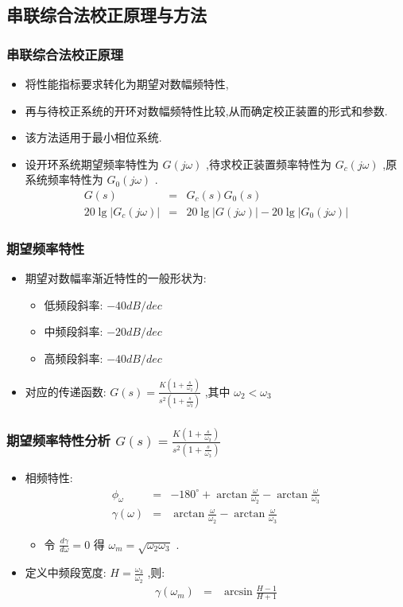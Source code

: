 \documentclass[table]{beamer}
\begin{document}
\subsection{串联综合法校正原理与方法}
\label{sec-5-1}
\begin{frame}
\frametitle{串联综合法校正原理}
\label{sec-5-1-1}

\begin{itemize}
\item <2->将性能指标要求转化为期望对数幅频特性,
\item <3->再与待校正系统的开环对数幅频特性比较,从而确定校正装置的形式和参数.
\item <4->该方法适用于最小相位系统.
\item <5->设开环系统期望频率特性为 $G(j\omega)$ ,待求校正装置频率特性为 $G_c(j\omega)$ ,原系统频率特性为 $G_0(j\omega)$ .
      \begin{eqnarray*}
      G(s) &= &G_c(s)G_0(s) \\
      20\lg|G_c(j\omega)| &=& 20\lg|G(j\omega)|-20\lg|G_0(j\omega)|
      \end{eqnarray*}
\end{itemize}
\end{frame}
\begin{frame}
\frametitle{期望频率特性}
\label{sec-5-1-2}

\begin{itemize}
\item 期望对数幅率渐近特性的一般形状为:
\begin{itemize}
\item 低频段斜率: $-40 dB/dec$
\item 中频段斜率: $-20 dB/dec$
\item 高频段斜率: $-40 dB/dec$
\end{itemize}
\item <2->对应的传递函数:  $G(s)=\frac{K(1+\frac{s}{\omega_2})}{s^2(1+\frac{s}{\omega_3})}$ ,其中 $\omega_2<\omega_3$
\end{itemize}
\end{frame}
\begin{frame}
\frametitle{期望频率特性分析 $G(s)=\frac{K(1+\frac{s}{\omega_2})}{s^2(1+\frac{s}{\omega_3})}$}
\label{sec-5-1-3}

\begin{itemize}
\item 相频特性:
      \begin{eqnarray*}
      \phi_{\omega} &=& -180^{\circ}+\arctan\frac{\omega}{\omega_2}-\arctan\frac{\omega}{\omega_3} \\
      \gamma(\omega) &=& \arctan\frac{\omega}{\omega_2}-\arctan\frac{\omega}{\omega_3} 
      \end{eqnarray*}
\begin{itemize}
\item 令  $\frac{d\gamma}{d\omega}=0$  得  $\omega_m=\sqrt{\omega_2\omega_3}$  .
\end{itemize}
\item <2->定义中频段宽度:  $H=\frac{\omega_3}{\omega_2}$ ,则:
      \begin{eqnarray*}
      \gamma(\omega_m) &= &\arcsin\frac{H-1}{H+1} 
      \end{eqnarray*}
\end{itemize}
\end{frame}
\end{document}
